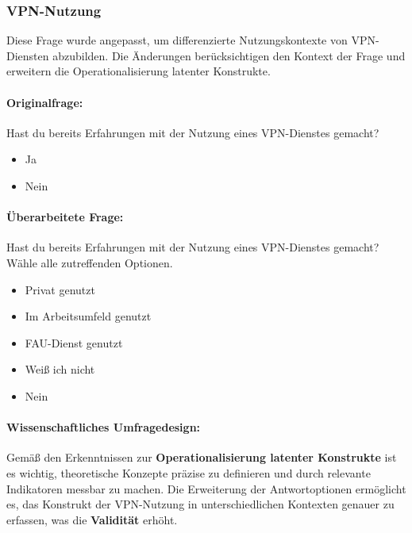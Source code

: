 \documentclass[german,report]{i1thesis}
\begin{document}
\subsubsection{VPN-Nutzung}

Diese Frage wurde angepasst, um differenzierte Nutzungskontexte von VPN-Diensten abzubilden. Die Änderungen berücksichtigen den Kontext der Frage und erweitern die Operationalisierung latenter Konstrukte.

\paragraph{Originalfrage:}

Hast du bereits Erfahrungen mit der Nutzung eines VPN-Dienstes gemacht?

\begin{itemize}
    \item Ja
    \item Nein
\end{itemize}

\paragraph{Überarbeitete Frage:}

Hast du bereits Erfahrungen mit der Nutzung eines VPN-Dienstes gemacht? Wähle alle zutreffenden Optionen.

\begin{itemize}
    \item Privat genutzt
    \item Im Arbeitsumfeld genutzt
    \item FAU-Dienst genutzt
    \item Weiß ich nicht
    \item Nein
\end{itemize}

\paragraph{Wissenschaftliches Umfragedesign:}

Gemäß den Erkenntnissen zur \textbf{Operationalisierung latenter Konstrukte} \cite{Tausendpfund2018} ist es wichtig, theoretische Konzepte präzise zu definieren und durch relevante Indikatoren messbar zu machen. Die Erweiterung der Antwortoptionen ermöglicht es, das Konstrukt der VPN-Nutzung in unterschiedlichen Kontexten genauer zu erfassen, was die \textbf{Validität} erhöht.
\end{document}
